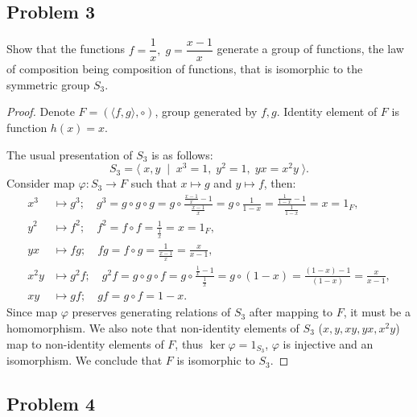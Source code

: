 \documentclass{article}
\theoremstyle{definition}
\begin{document}
\subsection*{Problem 3}

\begin{tcolorbox}
Show that the functions $f = \dfrac{1}{x}, \; g=\dfrac{x-1}{x}$ generate a group of functions, the law of composition being composition of functions, that is isomorphic to the symmetric group $S_3$.
\end{tcolorbox}

\begin{proof}

Denote $F = \left( \langle f,g \rangle, \circ \right)$, group generated by $f, g$.
Identity element of $F$ is function $h(x) = x$.

The usual presentation of $S_3$ is as follows:
\[ S_3 = \langle \; x, y \; \mid \; x^3 = 1, \; y^2 = 1, \; yx = x^2 y \; \rangle. \]
Consider map $\varphi: S_3 \to F$ such that $x \longmapsto g$ and $y \longmapsto f$, then:
\begin{align*}
    x^3 & \longmapsto g^3; \quad g^3
        = g \circ g \circ g 
        = g \circ \frac{\frac{x-1}{x}-1}{\frac{x-1}{x}} 
        = g \circ \frac{1}{1-x} 
        = \frac{\frac{1}{1-x}-1}{\frac{1}{1-x}} 
        = x = 1_F, \\ 
    y^2 & \longmapsto f^2; \quad f^2
        = f \circ f = \frac{1}{\frac{1}{x}} = x = 1_F, \\
    yx & \longmapsto fg; \quad fg
        = f \circ g = \frac{1}{\frac{x-1}{x}} = \frac{x}{x-1}, \\
    x^2 y & \longmapsto g^2 f; \quad g^2 f
        = g \circ g \circ f 
        = g \circ \frac{\frac{1}{x}-1}{\frac{1}{x}}
        = g \circ (1-x)
        = \frac{(1-x)-1}{(1-x)}
        = \frac{x}{x-1}, \\
    xy & \longmapsto gf; \quad gf
        = g \circ f
        = 1-x.
\end{align*}
Since map $\varphi$ preserves generating relations of $S_3$ after mapping to $F$, it must be a homomorphism.
We also note that non-identity elements of $S_3$ ($x,y,xy,yx,x^2 y$) map to non-identity elements of $F$, thus $\ker \varphi = 1_{S_3}$, $\varphi$ is injective and an isomorphism.
We conclude that $F$ is isomorphic to $S_3$.

\end{proof}


\subsection*{Problem 4}
\end{document}
